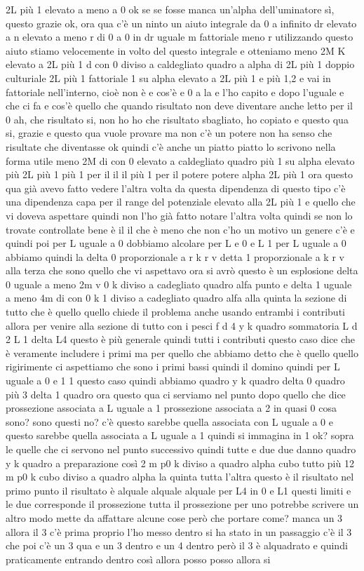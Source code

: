 \begin{soluzione}
   2L più 1 elevato a meno a 0 ok se se fosse manca un'alpha dell'uminatore sì, questo grazie ok, ora qua c'è un ninto un aiuto integrale da 0 a infinito dr elevato a n elevato a meno r di 0 a 0 in dr uguale m fattoriale meno r utilizzando questo aiuto stiamo velocemente in volto del questo integrale e otteniamo meno 2M K elevato a 2L più 1 d con 0 diviso a caldegliato quadro a alpha di 2L più 1 doppio culturiale 2L più 1 fattoriale 1 su alpha elevato a 2L più 1 e più 1,2 e vai in fattoriale nell'interno, cioè non è e cos'è e 0 a la e l'ho capito e dopo l'uguale e che ci fa e cos'è quello che quando risultato non deve diventare anche letto per il 0 ah, che risultato si, non ho ho che risultato sbagliato, ho copiato e questo qua si, grazie e questo qua vuole provare ma non c'è un potere non ha senso che risultate che diventasse ok quindi c'è anche un piatto piatto lo scrivono nella forma utile meno 2M di con 0 elevato a caldegliato quadro più 1 su alpha elevato più 2L più 1 più 1 per il il il più 1 per il potere potere alpha 2L più 1 ora questo qua già avevo fatto vedere l'altra volta da questa dipendenza di questo tipo c'è una dipendenza capa per il range del potenziale elevato alla 2L più 1 e quello che vi doveva aspettare quindi non l'ho già fatto notare l'altra volta quindi se non lo trovate controllate bene è il il che è meno che non c'ho un motivo un genere c'è e quindi poi per L uguale a 0 dobbiamo alcolare per L e 0 e L 1 per L uguale a 0 abbiamo quindi la delta 0 proporzionale a r k r v detta 1 proporzionale a k r v alla terza che sono quello che vi aspettavo ora si avrò questo è un esplosione delta 0 uguale a meno 2m v 0 k diviso a cadegliato quadro alfa punto e delta 1 uguale a meno 4m di con 0 k 1 diviso a cadegliato quadro alfa alla quinta la sezione di tutto che è quello quello chiede il problema anche usando entrambi i contributi allora per venire alla sezione di tutto con i pesci f d 4 y k quadro sommatoria L d 2 L 1 delta L4 questo è più generale quindi tutti i contributi questo caso dice che è veramente includere i primi ma per quello che abbiamo detto che è quello quello rigirimente ci aspettiamo che sono i primi bassi quindi il domino quindi per L uguale a 0 e 1 1 questo caso quindi abbiamo quadro y k quadro delta 0 quadro più 3 delta 1 quadro ora questo qua ci serviamo nel punto dopo quello che dice prossezione associata a L uguale a 1 prossezione associata a 2 in quasi 0 cosa sono? sono questi no? c'è questo sarebbe quella associata con L uguale a 0 e questo sarebbe quella associata a L uguale a 1 quindi si immagina in 1 ok? sopra le quelle che ci servono nel punto successivo quindi tutte e due due danno quadro y k quadro a preparazione così 2 m p0 k diviso a quadro alpha cubo tutto più 12 m p0 k cubo diviso a quadro alpha la quinta tutta l'altra questo è il risultato nel primo punto il risultato è alquale alquale alquale per L4 in 0 e L1 questi limiti e le due corresponde il prossezione tutta il prossezione per uno potrebbe scrivere un altro modo mette da affattare alcune cose però che portare come? manca un 3 allora il 3 c'è prima proprio l'ho messo dentro si ha stato in un passaggio c'è il 3 che poi c'è un 3 qua e un 3 dentro e un 4 dentro però il 3 è alquadrato e quindi praticamente entrando dentro così allora posso posso allora si 
\end{soluzione}
